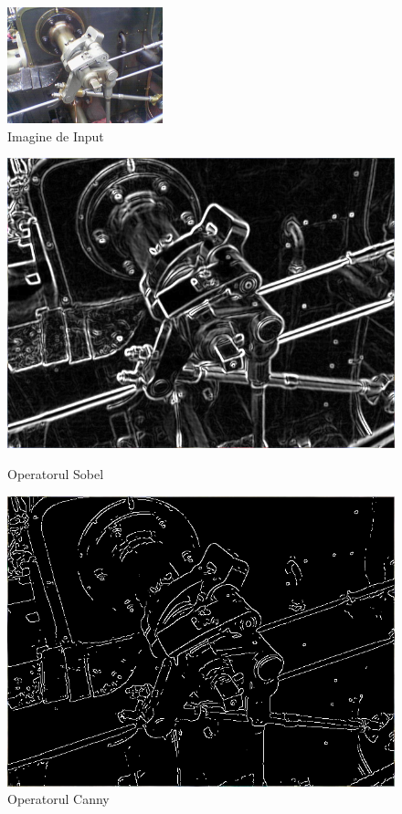 \documentclass[a4paper,12pt]{report}
\begin{document}
\begin{figure}[h!]
    \centering
    \includegraphics[width=0.4\textwidth]{images/input_edge_detection.jpg}
    \caption{Imagine de Input}
\end{figure}
\FloatBarrier
\begin{figure}[h!]
    \centering
    \begin{minipage}{0.4\textwidth}
        \centering
        \includegraphics[width=1\textwidth]{images/sobel_edge_detection.jpg}
        \caption{Operatorul Sobel}
    \end{minipage}
    \hspace{0.05\textwidth}
    \begin{minipage}{0.4\textwidth}
        \centering
        \includegraphics[width=1\textwidth]{images/canny_edge_detection.jpg}
        \caption{Operatorul Canny}
    \end{minipage}
\end{figure}
\FloatBarrier
\end{document}
